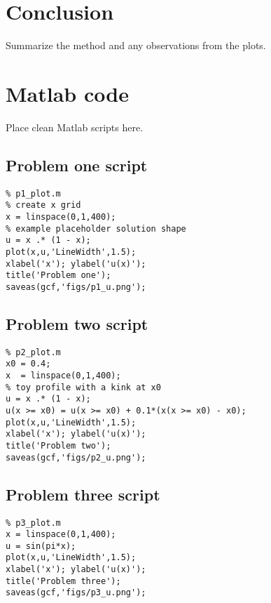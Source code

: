 \documentclass[12pt,a4paper]{article}
\newif\ifhavebib
\begin{document}
\section{Conclusion}
Summarize the method and any observations from the plots.

\ifhavebib
\newpage
\printbibliography
\fi

\appendix
\section{Matlab code}
Place clean Matlab scripts here.

\subsection*{Problem one script}
\begin{lstlisting}
% p1_plot.m
% create x grid
x = linspace(0,1,400);
% example placeholder solution shape
u = x .* (1 - x);
plot(x,u,'LineWidth',1.5);
xlabel('x'); ylabel('u(x)');
title('Problem one');
saveas(gcf,'figs/p1_u.png');
\end{lstlisting}

\subsection*{Problem two script}
\begin{lstlisting}
% p2_plot.m
x0 = 0.4;
x  = linspace(0,1,400);
% toy profile with a kink at x0
u = x .* (1 - x);
u(x >= x0) = u(x >= x0) + 0.1*(x(x >= x0) - x0);
plot(x,u,'LineWidth',1.5);
xlabel('x'); ylabel('u(x)');
title('Problem two');
saveas(gcf,'figs/p2_u.png');
\end{lstlisting}

\subsection*{Problem three script}
\begin{lstlisting}
% p3_plot.m
x = linspace(0,1,400);
u = sin(pi*x);
plot(x,u,'LineWidth',1.5);
xlabel('x'); ylabel('u(x)');
title('Problem three');
saveas(gcf,'figs/p3_u.png');
\end{lstlisting}
\end{document}
